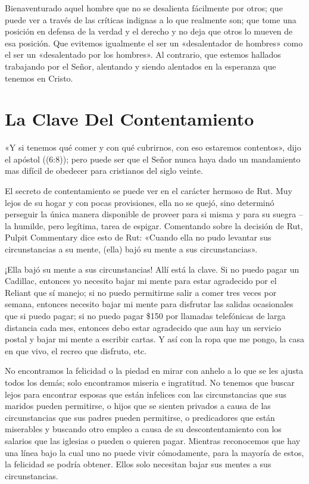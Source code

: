 \documentclass[12pt, twoside, openright]{book}
\begin{document}
Bienaventurado aquel hombre que no se desalienta fácilmente por otros; que puede ver a través de las críticas indignas a lo que realmente son; que tome una posición en defensa de la verdad y el derecho y no deja que otros lo mueven de esa posición. Que evitemos igualmente el ser un «desalentador de hombres» como el ser un «desalentado por los hombres». Al contrario, que estemos hallados trabajando por el Señor, alentando y siendo alentados en la esperanza que tenemos en Cristo.

\section{La Clave Del Contentamiento}
«Y si tenemos qué comer y con qué cubrirnos, con eso estaremos contentos», dijo el apóstol ((6:8)); pero puede ser que el Señor nunca haya dado un mandamiento mas difícil de obedecer para cristianos del siglo veinte.

El secreto de contentamiento se puede ver en el carácter hermoso de Rut. Muy lejos de su hogar y con pocas provisiones, ella no se quejó, sino determinó perseguir la única manera disponible de proveer para si misma y para su suegra – la humilde, pero legítima, tarea de espigar. Comentando sobre la decisión de Rut, Pulpit Commentary dice esto de Rut: «Cuando ella no pudo levantar sus circunstancias a su mente, (ella) bajó su mente a sus circunstancias».

¡Ella bajó su mente a sus circunstancias! Allí está la clave. Si no puedo pagar un Cadillac, entonces yo necesito bajar mi mente para estar agradecido por el Reliant que sí manejo; si no puedo permitirme salir a comer tres veces por semana, entonces necesito bajar mi mente para disfrutar las salidas ocasionales que si puedo pagar; si no puedo pagar \$150 por llamadas telefónicas de larga distancia cada mes, entonces debo estar agradecido que aun hay un servicio postal y bajar mi mente a escribir cartas. Y así con la ropa que me pongo, la casa en que vivo, el recreo que disfruto, etc.

No encontramos la felicidad o la piedad en mirar con anhelo a lo que se les ajusta todos los demás; solo encontramos miseria e ingratitud. No tenemos que buscar lejos para encontrar esposas que están infelices con las circunstancias que sus maridos pueden permitirse, o hijos que se sienten privados a causa de las circunstancias que sus padres pueden permitirse, o predicadores que están miserables y buscando otro empleo a causa de su descontentamiento con los salarios que las iglesias o pueden o quieren pagar. Mientras reconocemos que hay una línea bajo la cual uno no puede vivir cómodamente, para la mayoría de estos, la felicidad se podría obtener. Ellos solo necesitan bajar sus mentes a sus circunstancias.
\end{document}
